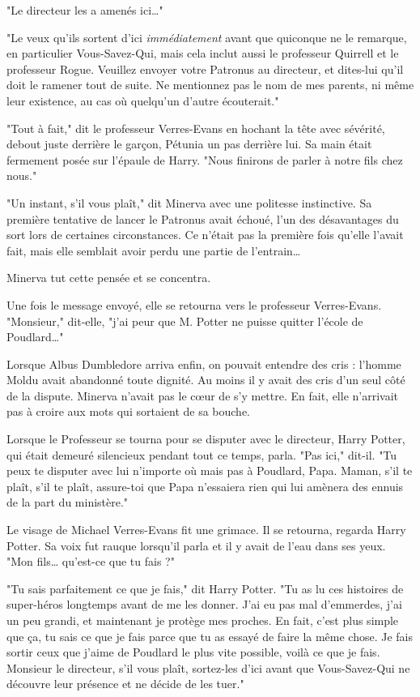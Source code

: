 "Le directeur les a amenés ici…"

"Le veux qu'ils sortent d'ici \emph{immédiatement}  avant que quiconque ne le remarque, en particulier Vous-Savez-Qui, mais cela inclut aussi le professeur Quirrell et le professeur Rogue. Veuillez envoyer votre Patronus au directeur, et dites-lui qu'il doit le ramener tout de suite. Ne mentionnez pas le nom de mes parents, ni même leur existence, au cas où quelqu'un d'autre écouterait."

"Tout à fait," dit le professeur Verres-Evans en hochant la tête avec sévérité, debout juste derrière le garçon, Pétunia un pas derrière lui. Sa main était fermement posée sur l'épaule de Harry. "Nous finirons de parler à notre fils chez nous."

"Un instant, s'il vous plaît," dit Minerva avec une politesse instinctive. Sa première tentative de lancer le Patronus avait échoué, l'un des désavantages du sort lors de certaines circonstances. Ce n'était pas la première fois qu'elle l'avait fait, mais elle semblait avoir perdu une partie de l'entrain…

Minerva tut cette pensée et se concentra.

Une fois le message envoyé, elle se retourna vers le professeur Verres-Evans. "Monsieur," dit-elle, "j'ai peur que M. Potter ne puisse quitter l'école de Poudlard…"

Lorsque Albus Dumbledore arriva enfin, on pouvait entendre des cris : l'homme Moldu avait abandonné toute dignité. Au moins il y avait des cris d'un seul côté de la dispute. Minerva n'avait pas le cœur de s'y mettre. En fait, elle n'arrivait pas à croire aux mots qui sortaient de sa bouche.

Lorsque le Professeur se tourna pour se disputer avec le directeur, Harry Potter, qui était demeuré silencieux pendant tout ce temps, parla. "Pas ici," dit-il. "Tu peux te disputer avec lui n'importe où mais pas à Poudlard, Papa. Maman, s'il te plaît, s'il te plaît, assure-toi que Papa n'essaiera rien qui lui amènera des ennuis de la part du ministère."

Le visage de Michael Verres-Evans fit une grimace. Il se retourna, regarda Harry Potter. Sa voix fut rauque lorsqu'il parla et il y avait de l'eau dans ses yeux. "Mon fils… qu'est-ce que tu fais ?"

"Tu sais parfaitement ce que je fais," dit Harry Potter. "Tu as lu ces histoires de super-héros longtemps avant de me les donner. J'ai eu pas mal d'emmerdes, j'ai un peu grandi, et maintenant je protège mes proches. En fait, c'est plus simple que ça, tu sais ce que je fais parce que tu as essayé de faire la même chose. Je fais sortir ceux que j'aime de Poudlard le plus vite possible, voilà ce que je fais. Monsieur le directeur, s'il vous plaît, sortez-les d'ici avant que Vous-Savez-Qui ne découvre leur présence et ne décide de les tuer."

